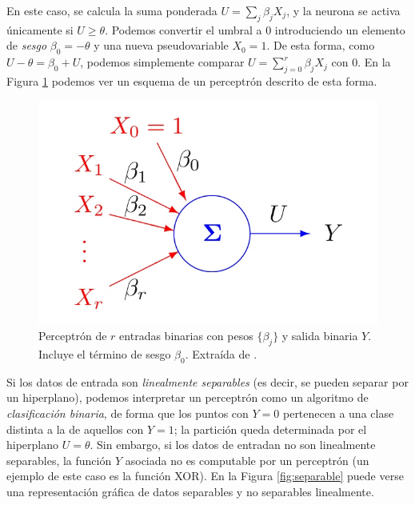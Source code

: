 \documentclass[
  a4paper,
  12pt,
  spanish,
]{scrartcl}
\theoremstyle{teorema-style}
\begin{document}
En este caso, se calcula la suma ponderada $U=\sum_j \beta_j X_j$, y la neurona se activa únicamente si $U\ge \theta$. Podemos convertir el umbral a $0$ introduciendo un elemento de \textit{sesgo} $\beta_0 = -\theta$ y una nueva pseudovariable $X_0 = 1$. De esta forma, como $U-\theta = \beta_0 + U$, podemos simplemente comparar $U=\sum_{j=0}^r \beta_j X_j$ con $0$. En la Figura \ref{fig:perceptron} podemos ver un esquema de un perceptrón descrito de esta forma.

\begin{figure}[h]
  \centering
  \includegraphics[width=.7\textwidth]{img/perceptron}
  \caption{Perceptrón de $r$ entradas binarias con pesos $\{\beta_j\}$ y salida binaria $Y$. Incluye el término de sesgo $\beta_0$. Extraída de \parencite{izenman_modern_2008}.}
  \label{fig:perceptron}
\end{figure}

Si los datos de entrada son \textit{linealmente separables} (es decir, se pueden separar por un hiperplano), podemos interpretar un perceptrón como un algoritmo de \textit{clasificación binaria}, de forma que los puntos con $Y=0$ pertenecen a una clase distinta a la de aquellos con $Y=1$; la partición queda determinada por el hiperplano $U=\theta$. Sin embargo, si los datos de entradan no son linealmente separables, la función $Y$ asociada no es computable por un perceptrón (un ejemplo de este caso es la función XOR). En la Figura \ref{fig:separable} puede verse una representación gráfica de datos separables y no separables linealmente.
\end{document}
